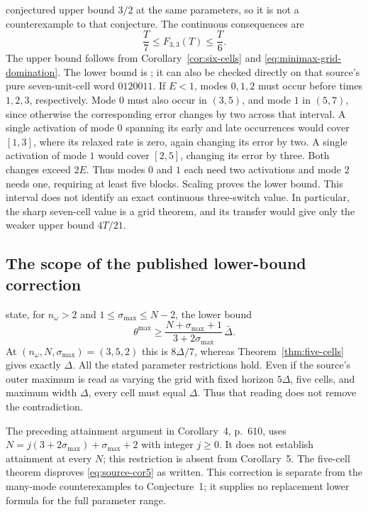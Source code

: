 conjectured upper bound $3/2$ at the same parameters, so it is not a
counterexample to that conjecture. The continuous consequences are
\begin{equation}\label{eq:three-three-band}
 \frac T7\le F_{3,3}(T)\le\frac T6.
\end{equation}
The upper bound follows from Corollary~\ref{cor:six-cells} and
\eqref{eq:minimax-grid-domination}. The lower bound is
\citet[Proposition~4, p.~612]{sager-zeile2021}; it can also be checked
directly on that source's pure seven-unit-cell word $0120011$.
If $E<1$, modes $0,1,2$ must occur before times $1,2,3$, respectively.
Mode $0$ must also occur in $(3,5)$, and mode $1$ in $(5,7)$, since
otherwise the corresponding error changes by two across that interval.
A single activation of mode $0$ spanning its early and late occurrences
would cover $[1,3]$, where its relaxed rate is zero, again changing
its error by two. A single activation of mode $1$ would cover $[2,5]$,
changing its error by three. Both changes exceed $2E$.
Thus modes $0$ and $1$ each need two activations and mode $2$ needs one,
requiring at least five blocks. Scaling proves the lower bound.
This interval does not identify an
exact continuous three-switch value. In particular, the sharp seven-cell
value is a grid theorem, and its transfer would give only the weaker
upper bound $4T/21$.

\subsection{The scope of the published lower-bound correction}
\citet[Corollary~5, p.~611]{sager-zeile2021} state, for
$n_\omega>2$ and $1\le\sigma_{\max}\le N-2$, the lower bound
\begin{equation}\label{eq:source-cor5}
 \theta^{\max}\ge
 \frac{N+\sigma_{\max}+1}{3+2\sigma_{\max}}\,\bar\Delta.
\end{equation}
At $(n_\omega,N,\sigma_{\max})=(3,5,2)$ this is $8\Delta/7$,
whereas Theorem~\ref{thm:five-cells} gives exactly $\Delta$.
All the stated parameter restrictions hold. Even if the source's outer
maximum is read as varying the grid with fixed horizon $5\Delta$, five
cells, and maximum width $\Delta$, every cell must equal $\Delta$.
Thus that reading does not remove the contradiction.

The preceding attainment argument in Corollary~4, p.~610, uses
$N=j(3+2\sigma_{\max})+\sigma_{\max}+2$ with integer $j\ge0$.
It does not establish attainment at every $N$; this restriction is absent
from Corollary~5. The five-cell theorem disproves
\eqref{eq:source-cor5} as written. This correction is separate from the
many-mode counterexamples to Conjecture~1; it supplies no replacement
lower formula for the full parameter range.
